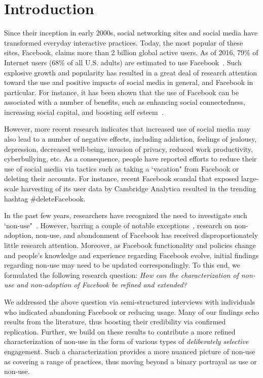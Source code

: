 \section{Introduction}
\label{sec:introduction}
Since their inception in early 2000s, social networking sites and social media have transformed everyday interactive practices. Today, the most popular of these sites, Facebook, claims more than 2 billion global active users. As of 2016, 79\% of Internet users (68\% of all U.S. adults) are estimated to use Facebook~\cite{greenwood2016social}. Such explosive growth and popularity has resulted in a great deal of research attention toward the use and positive impacts of social media in general, and Facebook in particular. For instance, it has been shown that the use of Facebook can be associated with a number of benefits, such as enhancing social connectedness, increasing social capital, and boosting self esteem~\cite{koroleva2011its,ellison2007benefits}.

However, more recent research indicates that increased use of social media may also lead to a number of negative effects, including addiction, feelings of jealousy, depression, decreased well-being, invasion of privacy, reduced work productivity, cyberbullying, etc. As a consequence, people have reported efforts to reduce their use of social media via tactics such as taking a \lq vacation" from Facebook or deleting their accounts. For instance, recent Facebook scandal that exposed large-scale harvesting of its user data by Cambridge Analytica resulted in the trending hashtag \#deleteFacebook.

In the past few years, researchers have recognized the need to investigate such \lq non-use"~\cite{baumer2014refusing}. However, barring a couple of notable exceptions~\cite{baumer2013limiting,lampe2013users}, research on non-adoption, non-use, and abandonment of Facebook has received disproportionately little research attention. Moreover, as Facebook functionality and policies change and people's knowledge and experience regarding Facebook evolve, initial findings regarding non-use may need to be updated correspondingly. To this end, we formulated the following research question: \emph{How can the characterization of non-use and non-adoption of Facebook be refined and extended?}

We addressed the above question via semi-structured interviews with individuals who indicated abandoning Facebook or reducing usage. Many of our findings echo results from the literature, thus boosting their credibility via confirmed replication. Further, we build on these results to contribute a more refined characterization of non-use in the form of various types of \emph{deliberately selective} engagement. Such a characterization provides a more nuanced picture of non-use as covering a range of practices, thus moving beyond a binary portrayal as use or non-use.


